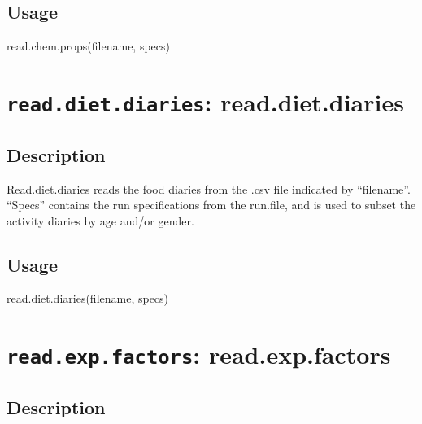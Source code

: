 \documentclass[
]{article}
\newenvironment{Shaded}{\begin{snugshade}}{\end{snugshade}}
\newcommand{\FunctionTok}[1]{\textcolor[rgb]{0.00,0.00,0.00}{#1}}
\newcommand{\NormalTok}[1]{#1}
\begin{document}
\hypertarget{usage-36}{%
\subsection{Usage}\label{usage-36}}

\begin{Shaded}
\begin{Highlighting}[]
\FunctionTok{read.chem.props}\NormalTok{(filename, specs)}
\end{Highlighting}
\end{Shaded}

\hypertarget{read.diet.diaries-read.diet.diaries}{%
\section{\texorpdfstring{\texttt{read.diet.diaries}:
read.diet.diaries}{read.diet.diaries: read.diet.diaries}}\label{read.diet.diaries-read.diet.diaries}}

\hypertarget{description-37}{%
\subsection{Description}\label{description-37}}

Read.diet.diaries reads the food diaries from the .csv file indicated by
``filename''. ``Specs'' contains the run specifications from the
run.file, and is used to subset the activity diaries by age and/or
gender.

\hypertarget{usage-37}{%
\subsection{Usage}\label{usage-37}}

\begin{Shaded}
\begin{Highlighting}[]
\FunctionTok{read.diet.diaries}\NormalTok{(filename, specs)}
\end{Highlighting}
\end{Shaded}

\hypertarget{read.exp.factors-read.exp.factors}{%
\section{\texorpdfstring{\texttt{read.exp.factors}:
read.exp.factors}{read.exp.factors: read.exp.factors}}\label{read.exp.factors-read.exp.factors}}

\hypertarget{description-38}{%
\subsection{Description}\label{description-38}}
\end{document}
